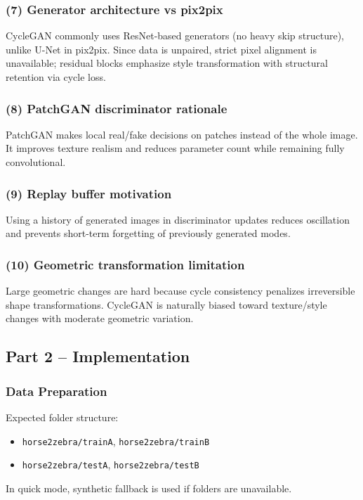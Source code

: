 \documentclass[conference]{IEEEtran}
\begin{document}
\subsubsection{(7) Generator architecture vs pix2pix}
CycleGAN commonly uses ResNet-based generators (no heavy skip structure), unlike U-Net in pix2pix. Since data is unpaired, strict pixel alignment is unavailable; residual blocks emphasize style transformation with structural retention via cycle loss.

\subsubsection{(8) PatchGAN discriminator rationale}
PatchGAN makes local real/fake decisions on patches instead of the whole image. It improves texture realism and reduces parameter count while remaining fully convolutional.

\subsubsection{(9) Replay buffer motivation}
Using a history of generated images in discriminator updates reduces oscillation and prevents short-term forgetting of previously generated modes.

\subsubsection{(10) Geometric transformation limitation}
Large geometric changes are hard because cycle consistency penalizes irreversible shape transformations. CycleGAN is naturally biased toward texture/style changes with moderate geometric variation.

\subsection{Part 2 -- Implementation}

\subsubsection{Data Preparation}
Expected folder structure:
\begin{itemize}
\item \texttt{horse2zebra/trainA}, \texttt{horse2zebra/trainB}
\item \texttt{horse2zebra/testA}, \texttt{horse2zebra/testB}
\end{itemize}
In quick mode, synthetic fallback is used if folders are unavailable.
\end{document}
